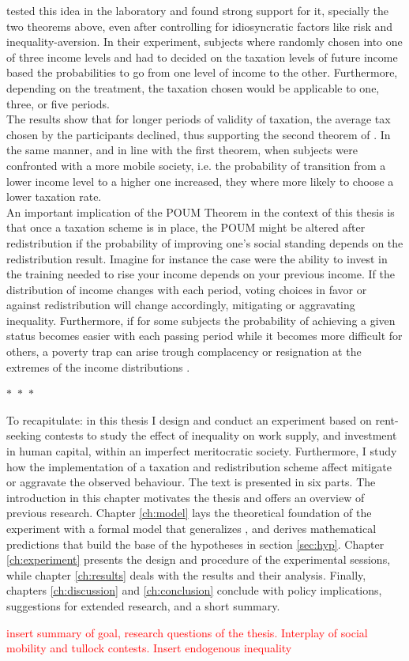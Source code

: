\cite{checchi2003} tested this idea in the laboratory and found strong support for it, specially the two theorems above, even after controlling for idiosyncratic factors like risk and inequality-aversion. In their experiment, subjects where randomly chosen into one of three income levels and had to decided on the taxation levels of future income based the probabilities to go from one level of income to the other. Furthermore, depending on the treatment, the taxation chosen would be applicable to one, three, or five periods.\\

The results show that for longer periods of validity of taxation, the average tax chosen by the participants declined, thus supporting the second theorem of \citeauthor{benabou2001}. In the same manner, and in line with the first theorem, when subjects were confronted with a more mobile society, i.e. the probability of transition from a lower income level to a higher one increased, they where more likely to choose a lower taxation rate.\\

An important implication of the POUM Theorem in the context of this thesis is that once a taxation scheme is in place, the POUM might be altered after redistribution if the probability of improving one's social standing depends on the redistribution result. Imagine for instance the case were the ability to invest in the training needed to rise your income depends on your previous income. If the distribution of income changes with each period, voting choices in favor or against redistribution will change accordingly, mitigating or aggravating inequality. Furthermore, if for some subjects the probability of achieving a given status becomes easier with each passing period while it becomes more difficult for others, a poverty trap can arise trough complacency or resignation at the extremes of the income distributions \citep{ceroni2001, ku2012}.

\begin{center}
  $\ast$~$\ast$~$\ast$
\end{center}

To recapitulate: in this thesis I design and conduct an experiment based on rent-seeking contests to study the effect of inequality on work supply, and investment in human capital, within an imperfect meritocratic society. Furthermore, I study how the implementation of a taxation and redistribution scheme affect mitigate or aggravate the observed behaviour. The text is presented in six parts. The introduction in this chapter motivates the thesis and offers an overview of previous research. Chapter \ref{ch:model} lays the theoretical foundation of the experiment with a formal model that generalizes \cite{koch2017}, and derives mathematical predictions that build the base of the hypotheses in section \ref{sec:hyp}. Chapter \ref{ch:experiment} presents the design and procedure of the experimental sessions, while chapter \ref{ch:results} deals with the results and their analysis. Finally, chapters \ref{ch:discussion} and \ref{ch:conclusion} conclude with policy implications, suggestions for extended research, and a short summary.

\textcolor{red}{insert summary of goal, research questions of the thesis. Interplay of social mobility and tullock contests. Insert endogenous inequality}\\